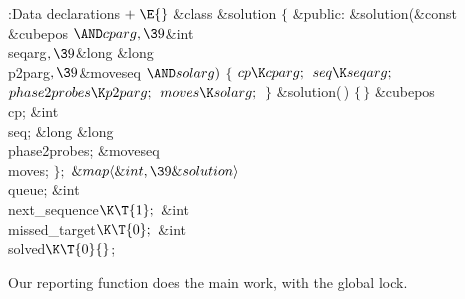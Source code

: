 \Y\B\4:Data declarations\X${}\mathrel+\E{}$\6
\&{class} \&{solution} ${}\{{}$\1\6
\4\&{public}:\6
\&{solution}(\&{const} \&{cubepos} ${}{\AND}\\{cparg},\39{}$\&{int} %
\\{seqarg}${},\39{}$\&{long} \&{long} \\{p2parg}${},\39{}$\&{moveseq} ${}{\AND}%
\\{solarg}){}$\1\1\2\2\6
${}\{{}$\1\6
${}\\{cp}\K\\{cparg};{}$\6
${}\\{seq}\K\\{seqarg};{}$\6
${}\\{phase2probes}\K\\{p2parg};{}$\6
${}\\{moves}\K\\{solarg};{}$\6
\4${}\}{}$\2\7
\&{solution}(\,)\1\1\2\2\6
${}\{\,\}{}$\7
\&{cubepos} \\{cp};\6
\&{int} \\{seq};\6
\&{long} \&{long} \\{phase2probes};\6
\&{moveseq} \\{moves};\2\6
${}\};{}$\6
${}\&{map}\langle\&{int},\39\&{solution}\rangle{}$ \\{queue};\6
\&{int} \\{next\_sequence}${}\K\T{1};{}$\6
\&{int} \\{missed\_target}${}\K\T{0};{}$\6
\&{int} \\{solved}${}\K\T{0}{}$;\par
\fi

Our reporting function does the main work, with the global lock.

